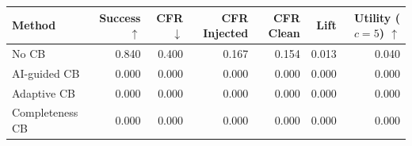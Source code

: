 \begin{tabular}{lrrrrrr}
\toprule
Method & Success $\uparrow$ & CFR $\downarrow$ & CFR Injected & CFR Clean & Lift & Utility ($c=5$) $\uparrow$ \\
\midrule
No CB & 0.840 & 0.400 & 0.167 & 0.154 & 0.013 & 0.040 \\
AI-guided CB & 0.000 & 0.000 & 0.000 & 0.000 & 0.000 & 0.000 \\
Adaptive CB & 0.000 & 0.000 & 0.000 & 0.000 & 0.000 & 0.000 \\
Completeness CB & 0.000 & 0.000 & 0.000 & 0.000 & 0.000 & 0.000 \\
\bottomrule
\end{tabular}
